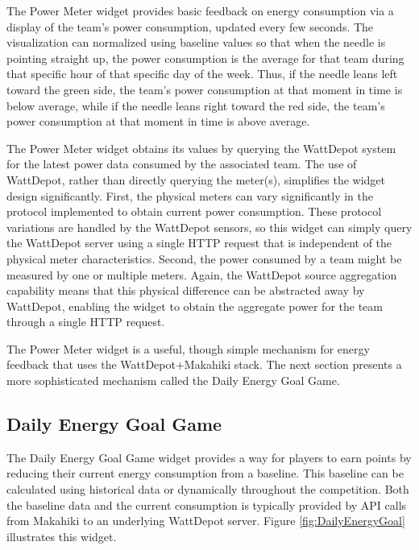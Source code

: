 The Power Meter widget provides basic feedback on energy consumption via a display of the team's power consumption, updated every few seconds.  The visualization can normalized using baseline values so that when the needle is pointing straight up, the power consumption is the average for that team during that specific hour of that specific day of the week.  Thus, if the needle leans left toward the green side, the team's power consumption at that moment in time is below average, while if the needle leans right toward the red side, the team's power consumption at that moment in time is above average.  

The Power Meter widget obtains its values by querying the WattDepot system for the latest power data consumed by the associated team.  The use of WattDepot, rather than directly querying the meter(s), simplifies the widget design significantly.  First, the physical meters can vary significantly in the protocol implemented to obtain current power consumption.   These protocol variations are handled by the WattDepot sensors, so this widget can simply query the WattDepot server using a single HTTP request that is independent of the physical meter characteristics.  Second, the power consumed by a team might be measured by one or multiple meters.  Again, the WattDepot source aggregation capability means that this physical difference can be abstracted away by WattDepot, enabling the widget to obtain the aggregate power for the team through a single HTTP request.

The Power Meter widget is a useful, though simple mechanism for energy feedback that uses the WattDepot+Makahiki stack.   The next section presents a more sophisticated mechanism called the Daily Energy Goal Game.

\subsection{Daily Energy Goal Game}

The Daily Energy Goal Game widget provides a way for players to earn points by reducing their current energy consumption from a baseline. This baseline can be calculated using historical data or dynamically throughout the competition. Both the baseline data and the current consumption is typically provided by API calls from Makahiki to an underlying WattDepot server.
Figure \ref{fig:DailyEnergyGoal} illustrates this widget.

